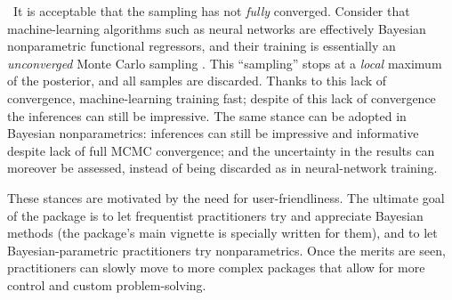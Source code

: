 \textbullet\ It is acceptable that the sampling has not \emph{fully} converged. Consider that machine-learning algorithms such as neural networks are effectively Bayesian nonparametric functional regressors, and their training is essentially an \emph{unconverged} Monte Carlo sampling \citep{mackay1992,gal2016,mandtetal2017,huszar2017}. This ``sampling'' stops at a \emph{local} maximum of the posterior, and all samples are discarded. Thanks to this lack of convergence, machine-learning training fast; despite of this lack of convergence the inferences can still be impressive. The same stance can be adopted in Bayesian nonparametrics: inferences can still be impressive and informative despite lack of full MCMC convergence; and the uncertainty in the results can moreover be assessed, instead of being discarded as in neural-network training.

These stances are motivated by the need for user-friendliness. The ultimate goal of the package is to let frequentist practitioners try and appreciate Bayesian methods (the package's main vignette is specially written for them), and to let Bayesian-parametric practitioners try nonparametrics. Once the  merits are seen, practitioners can slowly move to more complex packages that allow for more control and custom problem-solving.


{\small}



% 
% 


